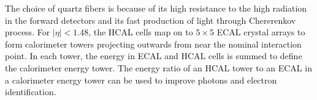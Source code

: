  The choice of quartz fibers is because of its high resistance to the high radiation in the forward detectors and its fast production of light through Chererenkov process. 
\newline
For $\vert \eta \vert < 1.48$, the HCAL cells map on to $5 \times 5$ ECAL crystal arrays to form calorimeter towers projecting  outwards from near the nominal interaction point. 
In each tower, the energy in ECAL and HCAL cells is summed to define the calorimeter energy tower. The energy ratio of an 
HCAL tower to an ECAL in a calorimeter energy tower can be used to improve photons and electron identification. 
